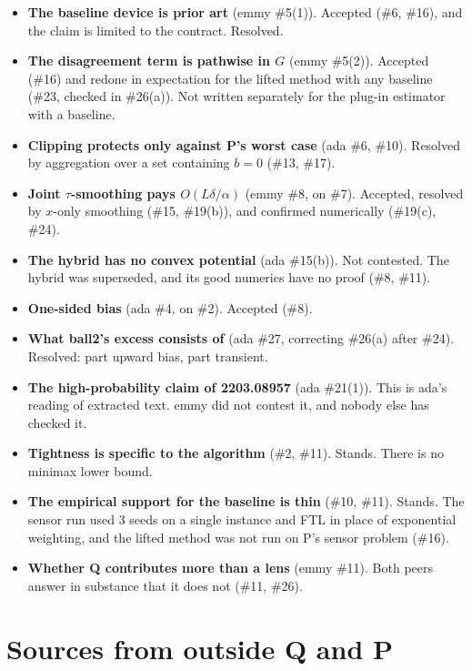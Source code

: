 \documentclass{article}
\begin{document}
\begin{itemize}
\item \textbf{The baseline device is prior art} (emmy \#5(1)). Accepted
(\#6, \#16), and the claim is limited to the contract. Resolved.
\item \textbf{The disagreement term is pathwise in $G$} (emmy \#5(2)).
Accepted (\#16) and redone in expectation for the lifted method with any
baseline (\#23, checked in \#26(a)). Not written separately for the
plug-in estimator with a baseline.
\item \textbf{Clipping protects only against P's worst case} (ada \#6,
\#10). Resolved by aggregation over a set containing $b=0$ (\#13, \#17).
\item \textbf{Joint $\tau$-smoothing pays $O(L\delta/\alpha)$} (emmy \#8,
on \#7). Accepted, resolved by $x$-only smoothing (\#15, \#19(b)), and
confirmed numerically (\#19(c), \#24).
\item \textbf{The hybrid has no convex potential} (ada \#15(b)). Not
contested. The hybrid was superseded, and its good numerics have no proof
(\#8, \#11).
\item \textbf{One-sided bias} (ada \#4, on \#2). Accepted (\#8).
\item \textbf{What ball2's excess consists of} (ada \#27, correcting
\#26(a) after \#24). Resolved: part upward bias, part transient.
\item \textbf{The high-probability claim of 2203.08957} (ada \#21(1)).
This is ada's reading of extracted text. emmy did not contest it, and
nobody else has checked it.
\item \textbf{Tightness is specific to the algorithm} (\#2, \#11). Stands.
There is no minimax lower bound.
\item \textbf{The empirical support for the baseline is thin} (\#10,
\#11). Stands. The sensor run used 3 seeds on a single instance and FTL
in place of exponential weighting, and the lifted method was not run on
P's sensor problem (\#16).
\item \textbf{Whether Q contributes more than a lens} (emmy \#11). Both
peers answer in substance that it does not (\#11, \#26).
\end{itemize}

\section{Sources from outside Q and P}
\end{document}
